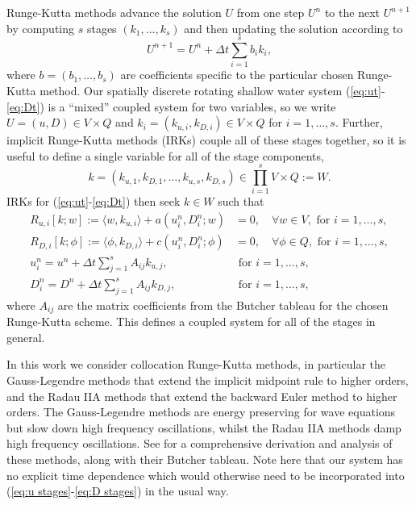 \documentclass[a4paper, 12pt]{article}
\begin{document}
Runge-Kutta methods advance the solution $U$ from one step $U^n$ to
the next $U^{n+1}$ by computing $s$ stages $(k_1,\ldots,k_s)$ and then
updating the solution according to
\begin{equation}
  U^{n+1} = U^n + \Delta t\sum_{i=1}^s b_i k_i,
\end{equation}
where $b=(b_1,\ldots, b_s)$ are coefficients specific to the
particular chosen Runge-Kutta method. Our spatially discrete rotating
shallow water system (\ref{eq:ut}-\ref{eq:Dt}) is a ``mixed'' coupled
system for two variables, so we write $U=(u,D)\in V\times Q$ and $k_i
= (k_{u,i},k_{D,i})\in V\times Q$ for $i=1,\ldots,s$. Further,
implicit Runge-Kutta methods (IRKs) couple all of these stages together, so it
is useful to define a single variable for all of the stage components,
\[
k = (k_{u,1},k_{D,1},\ldots,k_{u,s},k_{D,s}) \in
\prod_{i=1}^s V\times Q := W.
\]
IRKs for (\ref{eq:ut}-\ref{eq:Dt}) then 
seek $k\in W$ such that
\begin{align}
    \label{eq:u stages}
    R_{u,i}[k;w] := \langle w, k_{u,i} \rangle +  a\left(
    u^n_i,D^n_i;w\right)
  & = 0,  
  \quad \forall w \in V,\mbox{ for }i=1,\ldots,s, \\
  \label{eq:D stages}
  R_{D,i}[k;\phi] := \langle \phi, k_{D,i} \rangle +  c\left(u^n_i,D^n_i; \phi\right)
  & = 0, \quad \forall \phi \in Q, \mbox{ for }i=1,\ldots,s,\\
  u^n_i = u^n + \Delta t\sum_{j=1}^sA_{ij}k_{u,j}, & \mbox{ for }i=1,\ldots,s,\\
  D^n_i = D^n + \Delta t\sum_{j=1}^sA_{ij}k_{D,j}, & \mbox{ for }i=1,\ldots,s,
\end{align}
where $A_{ij}$ are the matrix coefficients from the Butcher
tableau for the chosen Runge-Kutta scheme. This defines a coupled
system for all of the stages in general.

In this work
we consider collocation Runge-Kutta methods, in particular the
Gauss-Legendre methods that extend the implicit midpoint rule to
higher orders, and the Radau IIA methods that extend the backward Euler
method to higher orders. The Gauss-Legendre methods are energy
preserving for wave equations but slow down high frequency
oscillations, whilst the Radau IIA methods damp high frequency
oscillations.  See \citet{wanner1996solving} for a comprehensive
derivation and analysis of these methods, along with their Butcher
tableau. Note here that our system has no explicit time dependence
which would otherwise need to be incorporated into (\ref{eq:u
  stages}-\ref{eq:D stages}) in the usual way.
\end{document}
